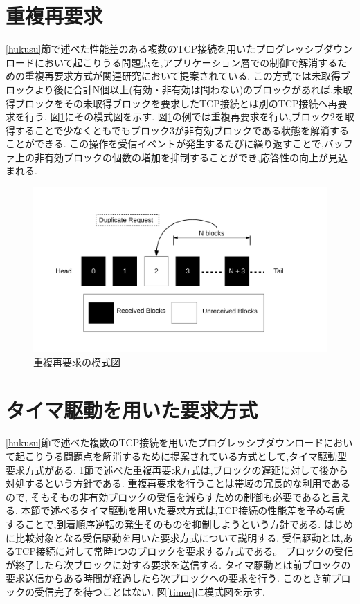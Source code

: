 \documentclass[a4j,12pt]{gradthesis_utf8}
\begin{document}
 \section{重複再要求}
 \label{juhuku}
 \ref{hukusu}節で述べた性能差のある複数のTCP接続を用いたプログレッシブダウンロードにおいて起こりうる問題点を,アプリケーション層での制御で解消するための重複再要求方式が関連研究\cite{proxy}において提案されている.
 この方式では未取得ブロックより後に合計N個以上(有効・非有効は問わない)のブロックがあれば,未取得ブロックをその未取得ブロックを要求したTCP接続とは別のTCP接続へ再要求を行う.
 図\ref{blockdup}にその模式図を示す.
 図\ref{blockdup}の例では重複再要求を行い,ブロック2を取得することで少なくともでもブロック3が非有効ブロックである状態を解消することができる.
 この操作を受信イベントが発生するたびに繰り返すことで,バッファ上の非有効ブロックの個数の増加を抑制することができ,応答性の向上が見込まれる.
 
 \begin{figure}[ht]
     \centering
     \includegraphics[width=18cm]{figure/block_dup.pdf}
     \caption{重複再要求の模式図}
     \label{blockdup}
 \end{figure}

\newpage
 
\section{タイマ駆動を用いた要求方式}
\ref{hukusu}節で述べた複数のTCP接続を用いたプログレッシブダウンロードにおいて起こりうる問題点を解消するために提案されている方式として,タイマ駆動型要求方式がある\cite{horiba}.
\ref{juhuku}節で述べた重複再要求方式は,ブロックの遅延に対して後から対処するという方針である.
重複再要求を行うことは帯域の冗長的な利用であるので,
そもそもの非有効ブロックの受信を減らすための制御も必要であると言える.
本節で述べるタイマ駆動を用いた要求方式は,TCP接続の性能差を予め考慮することで,到着順序逆転の発生そのものを抑制しようという方針である.
はじめに比較対象となる受信駆動を用いた要求方式について説明する.
受信駆動とは,あるTCP接続に対して常時1つのブロックを要求する方式である。
ブロックの受信が終了したら次ブロックに対する要求を送信する.
タイマ駆動とは前ブロックの要求送信からある時間が経過したら次ブロックへの要求を行う.
このとき前ブロックの受信完了を待つことはない.
図\ref{timer}に模式図を示す.
\end{document}
